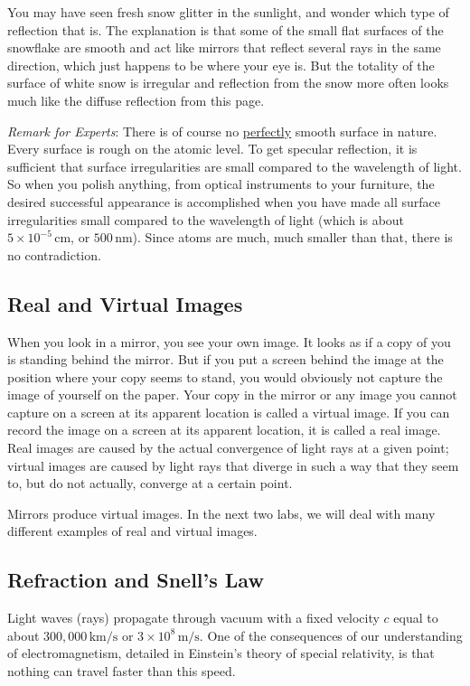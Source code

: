 You may have seen fresh snow glitter in the sunlight, and wonder which type of reflection that is. The explanation is that some of the small flat surfaces of the snowflake are smooth and act like mirrors that reflect several rays in the same direction, which just happens to be where your eye is. But the totality of the surface of white snow is irregular and reflection from the snow more often looks much like the diffuse reflection from this page.\myskip

\emph{Remark for Experts}: There is of course no \underline{perfectly} smooth surface in nature. Every surface is rough on the atomic level. To get specular reflection, it is sufficient that surface irregularities are small compared to the wavelength of light. So when you polish anything, from optical instruments to your furniture, the desired successful appearance is accomplished when you have made all surface irregularities small compared to the wavelength of light (which is about $5\times 10^{-5}\,\mathrm{cm}$, or $500\,\mathrm{nm}$). Since atoms are much, much smaller than that, there is no contradiction.

\subsection{Real and Virtual Images}

When you look in a mirror, you see your own image. It looks as if a copy of you is standing behind the mirror. But if you put a screen behind the image at the position where your copy seems to stand, you would obviously not capture the image of yourself on the paper. Your copy in the mirror or any image you cannot capture on a screen at its apparent location is called a virtual image. If you can record the image on a screen at its apparent location, it is called a real image. Real images are caused by the actual convergence of light rays at a given point; virtual images are caused by light rays that diverge in such a way that they seem to, but do not actually, converge at a certain point.\myskip

Mirrors produce virtual images. In the next two labs, we will deal with many different examples of real and virtual images.

\subsection{Refraction and Snell's Law}

Light waves (rays) propagate through vacuum with a fixed velocity $c$ equal to about $300,000\,\mathrm{km/s}$ or $3\times 10^8\,\mathrm{m/s}$. One of the consequences of our understanding of electromagnetism, detailed in Einstein's theory of special relativity, is that nothing can travel faster than this speed.  \myskip

